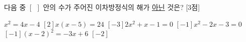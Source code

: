 다음 중 $[\ \ ]$ 안의 수가 주어진 이차방정식의 해가 \underline{아닌} 것은? \mbox{[3점]}
\begin{choicesv}{$x^2=4x-4$ \quad $[2]$}{$x(x-5)=24$ \quad $[-3]$}{$2x^2+x-1=0$ \quad $[-1]$}{$x^2-2x-3=0$ \quad $[-1]$}{$(x-2)^2=-3x+6$ \quad $[-2]$}\end{choicesv}
